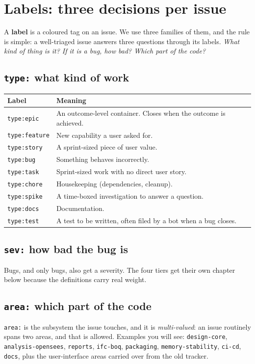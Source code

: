 \documentclass[11pt,a4paper]{report}
\newcommand{\code}[1]{\texttt{#1}}
\begin{document}
\chapter{Labels: three decisions per issue}

A \textbf{label} is a coloured tag on an issue. We use three families of them, and
the rule is simple: a well-triaged issue answers three questions through its
labels. \emph{What kind of thing is it? If it is a bug, how bad? Which part of the
code?}

\section{\code{type:} what kind of work}
\begin{center}
\begin{tabular}{@{}lp{9.5cm}@{}}
\toprule
\textbf{Label} & \textbf{Meaning} \\
\midrule
\code{type:epic}    & An outcome-level container. Closes when the outcome is achieved. \\
\code{type:feature} & New capability a user asked for. \\
\code{type:story}   & A sprint-sized piece of user value. \\
\code{type:bug}     & Something behaves incorrectly. \\
\code{type:task}    & Sprint-sized work with no direct user story. \\
\code{type:chore}   & Housekeeping (dependencies, cleanup). \\
\code{type:spike}   & A time-boxed investigation to answer a question. \\
\code{type:docs}    & Documentation. \\
\code{type:test}    & A test to be written, often filed by a bot when a bug closes. \\
\bottomrule
\end{tabular}
\end{center}

\section{\code{sev:} how bad the bug is}
Bugs, and only bugs, also get a severity. The four tiers get their own chapter
below because the definitions carry real weight.

\section{\code{area:} which part of the code}
\code{area:} is the subsystem the issue touches, and it is \emph{multi-valued}: an
issue routinely spans two areas, and that is allowed. Examples you will see:
\code{design-core}, \code{analysis-opensees}, \code{reports}, \code{ifc-boq},
\code{packaging}, \code{memory-stability}, \code{ci-cd}, \code{docs}, plus the
user-interface areas carried over from the old tracker.
\end{document}
